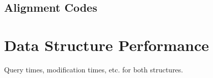 \subsection{Alignment Codes}

\section{Data Structure Performance}

Query times, modification times, etc. for both structures.

